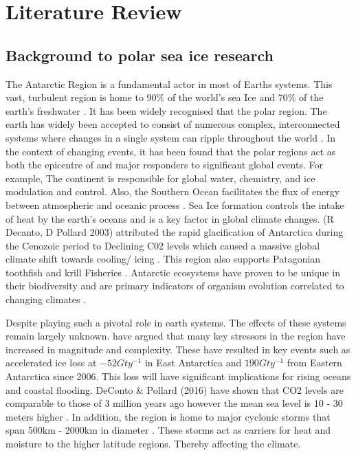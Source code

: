 
\chapter{Literature Review}
\label{ch:chapter2}
\section{Background to polar sea ice research}

The Antarctic Region is a fundamental actor in most of Earths systems. This vast, turbulent region is home to 90\% of the world's sea Ice and 70\% of the earth's freshwater \cite{kennicutt2014polar}. It has been widely recognised that the polar region. The earth has widely been accepted to consist of numerous complex, interconnected systems where changes in a single system can ripple throughout the world \cite{kennicutt2016delivering}. In the context of changing events, it has been found that the polar regions act as both the epicentre of and major responders to significant global events. For example, The continent is responsible for global water, chemistry, and ice modulation and control. Also, the Southern Ocean facilitates the flux of energy between atmospheric and oceanic process \cite{kennicutt2016delivering}. Sea Ice formation controls the intake of heat by the earth's oceans and is a key factor in global climate changes. (R Decanto, D Pollard 2003) attributed the rapid glacification of Antarctica during the Cenozoic period to Declining C02 levels which caused a massive global climate shift towards cooling/ icing \cite{deconto2003rapid}. This region also supports Patagonian toothfish and krill Fisheries \cite{kennicutt2014polar}. Antarctic ecosystems have proven to be unique in their biodiversity and are primary indicators of organism evolution correlated to changing climates \cite{kennicutt2016delivering}.\par

Despite playing such a pivotal role in earth systems. The effects of these systems remain largely unknown. \textcite{kennicutt2016delivering} have argued that many key stressors in the region have increased in magnitude and complexity. These have resulted in key events such as accelerated ice loss at $-52Gty^{-1}$ in East Antarctica and $190Gty^{-1}$ from Eastern Antarctica \cite{chen2009accelerated} since 2006. This loss will have significant implications for rising oceans and coastal flooding. DeConto \& Pollard (2016) have shown that CO2 levels are comparable to those of 3 million years ago however the mean sea level is 10 - 30 meters higher \cite{deconto2016contribution}.  In addition, the region is home to major cyclonic storms that span 500km - 2000km in diameter \cite{vichi2019effects}. These storms act as carriers for heat and moisture to the higher latitude regions. Thereby affecting the climate. \par

